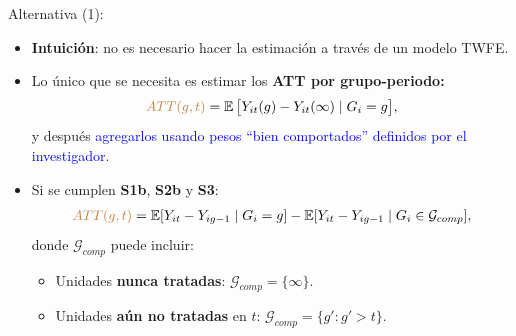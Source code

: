 \documentclass[10pt, xcolor=dvipsnames]{beamer}
\begin{document}
\begin{frame}{Alternativa (1): \citet{callaway_difference--differences_2020}}
\begin{itemize}\setlength{\itemsep}{0.8em}
    \item \textbf{Intuición}: no es necesario hacer la estimación a través de un modelo TWFE. 
    \item Lo único que se necesita es estimar los \textbf{ATT por grupo-periodo:}
    \begin{align*}
        \textcolor{brown}{ATT(g,t)} = \operatorname{\mathbb{E}} \big[Y_{it}(g) - Y_{it}(\infty) \mid G_i=g\big],
    \end{align*} 
    y después \textcolor{blue}{agregarlos usando pesos ``bien comportados'' definidos por el investigador}.
    \item Si se cumplen \textbf{S1b}, \textbf{S2b} y \textbf{S3}:
    {\small
    \begin{align}\label{EQ:CS}
        \textcolor{brown}{ATT(g, t)} = \operatorname{\mathbb{E}}[Y_{it} - Y_{ig-1} \mid G_i = g] - \mathbb{E}[Y_{it} - Y_{ig-1} \mid G_i \in \mathcal{G}_{comp}],
    \end{align}
    }
     donde $\mathcal{G}_{comp}$ puede incluir:
    \begin{itemize}
        \item Unidades \textbf{nunca tratadas}: $\mathcal{G}_{comp} = \{\infty\}$.
        \item Unidades \textbf{aún no tratadas} en $t$: $\mathcal{G}_{comp} = \{g' : g' > t\}$.
    \end{itemize}
\end{itemize}
\end{frame}
\end{document}
